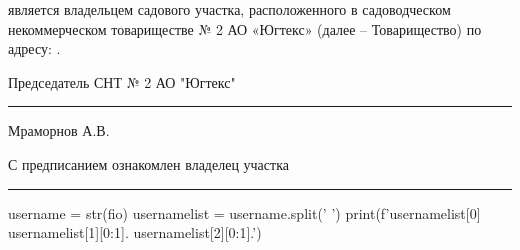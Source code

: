  является владельцем садового участка, расположенного в садоводческом некоммерческом товариществе № 2 АО «Югтекс» (далее – Товарищество) по адресу: .  

\vspace{5mm}



\vspace{15mm}
\noindent Председатель СНТ № 2 АО "Югтекс" \hfill    \rule{3cm}{0.1 mm}    Мраморнов А.В.

\vspace{15mm}
\noindent С предписанием ознакомлен   \hfill    владелец участка  \rule{3cm}{0.1 mm} 
\begin{pycode}
    username = str(fio)
    usernamelist = username.split(' ')
    print(f'{usernamelist[0]}  {usernamelist[1][0:1]}. {usernamelist[2][0:1]}.')
\end{pycode}




